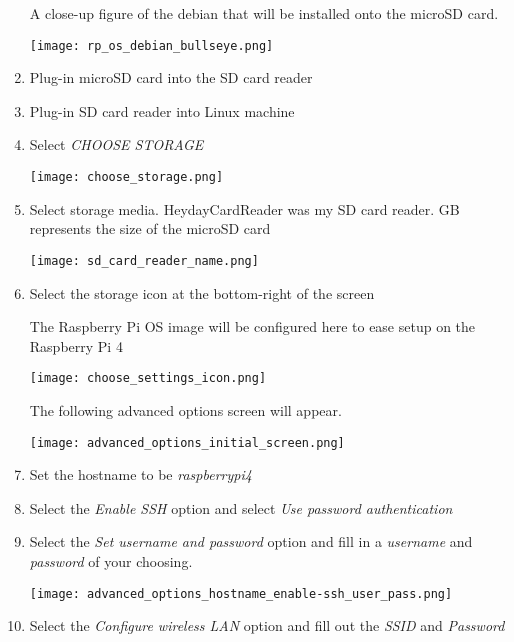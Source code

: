 \documentclass[journal]{IEEEtran}
\begin{document}
\begin{enumerate}
        A close-up figure  of the debian that will be installed onto the microSD card. \newline

        \texttt{[image: rp\_os\_debian\_bullseye.png]}
        
        \item Plug-in microSD card into the SD card reader
        \item Plug-in SD card reader into Linux machine

        \item Select \emph{CHOOSE STORAGE}
        
        \texttt{[image: choose\_storage.png]}
        
        \item Select storage media. \newline
        HeydayCardReader was my SD card reader.  GB represents the size of the microSD card

        \texttt{[image: sd\_card\_reader\_name.png]}

        \item Select the storage icon at the bottom-right of the screen \newline
        
        The Raspberry Pi OS image will be configured here to ease setup on the Raspberry Pi 4

        \texttt{[image: choose\_settings\_icon.png]}

        The following advanced options screen will appear. \newline

        \texttt{[image: advanced\_options\_initial\_screen.png]}

        \item Set the hostname to be \emph{raspberrypi4}
        \item Select the \emph{Enable SSH} option and select \emph{Use password authentication}
        \item Select the \emph{Set username and password} option and fill in a \emph{username} and \emph{password} of your choosing.
        
        \texttt{[image: advanced\_options\_hostname\_enable-ssh\_user\_pass.png]}

        \item Select the \emph{Configure wireless LAN} option and fill out the \emph{SSID} and \emph{Password}
        

\end{enumerate}
\end{document}
